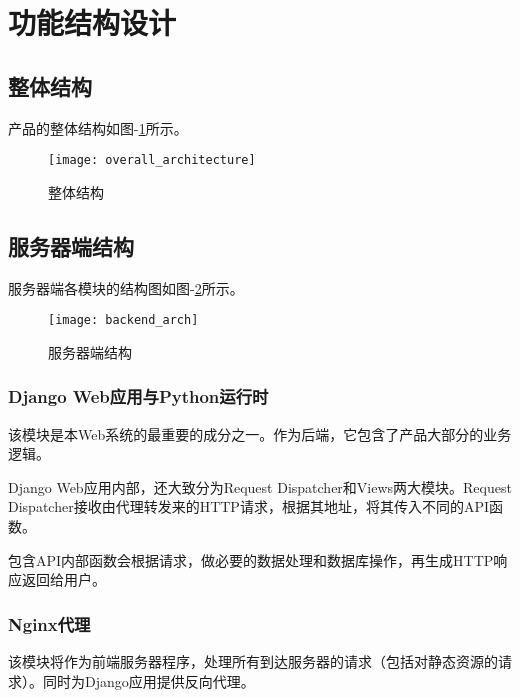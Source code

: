 \section{功能结构设计}
\subsection{整体结构}
产品的整体结构如图-\ref{fig:overall_architecture}所示。
\begin{figure}[]
	\centering
	\texttt{[image: overall\_architecture]}
	\caption{整体结构} \label{fig:overall_architecture}
\end{figure}


\subsection{服务器端结构}
服务器端各模块的结构图如图-\ref{fig:backend_architecture}所示。
\begin{figure}[]
	\centering
	\texttt{[image: backend\_arch]}
	\caption{服务器端结构} \label{fig:backend_architecture}
\end{figure}
\subsubsection{Django Web应用与Python运行时}
该模块是本Web系统的最重要的成分之一。作为后端，它包含了产品大部分的业务逻辑。

Django Web应用内部，还大致分为Request Dispatcher和Views两大模块。Request Dispatcher接收由代理转发来的HTTP请求，根据其地址，将其传入不同的API函数。

包含API内部函数会根据请求，做必要的数据处理和数据库操作，再生成HTTP响应返回给用户。

\subsubsection{Nginx代理}
该模块将作为前端服务器程序，处理所有到达服务器的请求（包括对静态资源的请求）。同时为Django应用提供反向代理。

